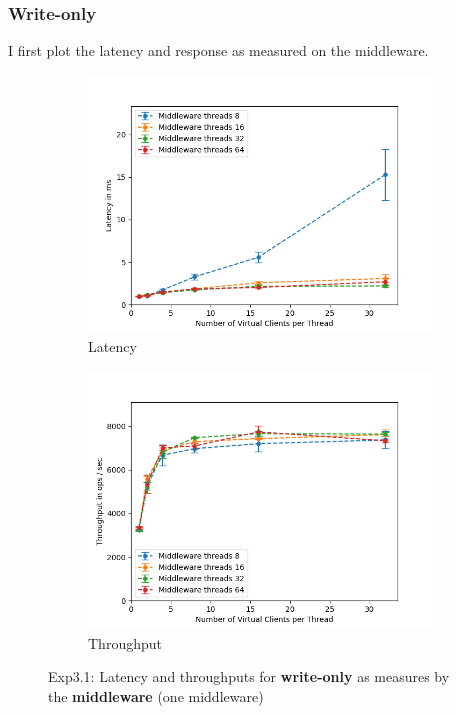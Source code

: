 \documentclass[11pt,a4paper]{article}
\begin{document}
\subsubsection{Write-only}

I first plot the latency and response as measured on the middleware.

\begin{figure}[H]
\centering
\begin{subfigure}{.5\textwidth}
    \centering
    \includegraphics[width=\textwidth]{img/exp3_1/exp3_1__latency_middleware_write_1.png}
    \caption{Latency}
    \label{fig:mesh1}
\end{subfigure}%
\begin{subfigure}{.5\textwidth}
      \centering
    \includegraphics[width=\textwidth]{img/exp3_1/exp3_1__throughput_middleware_write_1.png}
    \caption{Throughput}
    \label{fig:mesh1}
\end{subfigure}
\caption{Exp3.1: Latency and throughputs for \textbf{write-only} as measures by the \textbf{middleware} (one middleware)}
\label{fig:test}
\end{figure}
\end{document}
